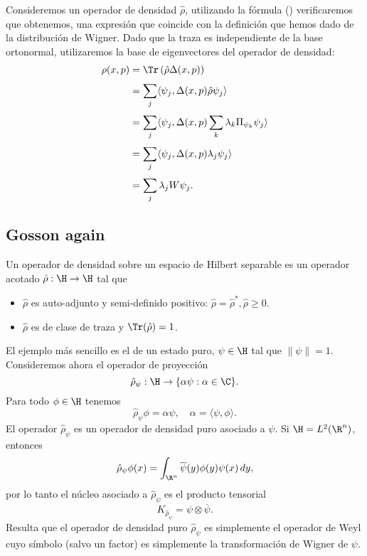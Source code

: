   Consideremos un operador de densidad $\hat{\rho}$,
  utilizando la fórmula () verificaremos que obtenemos, una
  expresión que coincide con la definición que hemos dado de
  la distribución de Wigner. Dado que la traza es
  independiente de la base ortonormal, utilizaremos la base
  de eigenvectores del operador de densidad:
  \begin{align*}
    \rho(x,p) &= \Tr\left( \hat{\rho} \Delta(x,p) \right) \\
              &= \sum_{j}^{} \langle \psi_j, 
              \Delta(x,p) \hat{\rho} \psi_j \rangle \\
              &= \sum_{j}^{} \langle \psi_j, \Delta(x,p)
              \sum_{k}^{} \lambda_k \Pi_{\psi_k} \psi_j
              \rangle \\
              &= \sum_{j}^{} \langle \psi_j, \Delta(x,p)
              \lambda_j \psi_j \rangle \\
              &= \sum_{j}^{} \lambda_j W\psi_j.
  \end{align*}

  \subsection{Gosson again}

  \begin{definition}
    Un operador de densidad sobre un espacio de Hilbert
    separable es un operador acotado $\hat{\rho} : \H \to
    \H$ tal que
    \begin{itemize}
      \item $\hat{\rho}$ es auto-adjunto y semi-definido
        positivo: $\hat{\rho} = \hat{\rho}^{*}, \hat{\rho}
        \geq 0$.
      \item $\hat{\rho}$ es de clase de traza y
        $\Tr(\hat{\rho}) = 1$.
    \end{itemize}
  \end{definition}

  El ejemplo más sencillo es el de un estado puro, $\psi \in
  \H$ tal que $\|\psi\| = 1$. Consideremos ahora el operador
  de proyección
  \[
    \hat{\rho}_\psi : \H \to \{\alpha \psi : \alpha \in
    \C\}.
  \] 
  Para todo $\phi \in \H$ tenemos
  \[
    \hat{\rho}_\psi \phi
    = \alpha \psi,
    \quad \alpha = \langle \psi, \phi \rangle.
  \] 
  El operador $\hat{\rho}_\psi$ es un operador de densidad
  puro asociado a $\psi$. Si $\H = L^2(\R^{n})$, entonces
  \[
    \hat{\rho}_\psi \phi(x)
    = \int_{\R^{n}} \overline{\psi}(y)\phi(y) \psi(x) \, dy,
  \] 
  por lo tanto el núcleo asociado a $\hat{\rho}_\psi$ es el
  producto tensorial
  \[
    K_{\hat{\rho}_\psi} = \psi \otimes \overline{\psi}.
  \] 
  Resulta que el operador de densidad puro $\hat{\rho}_\psi$ 
  es simplemente el operador de Weyl cuyo símbolo (salvo un
  factor) es simplemente la transformación de Wigner de
  $\psi$.

